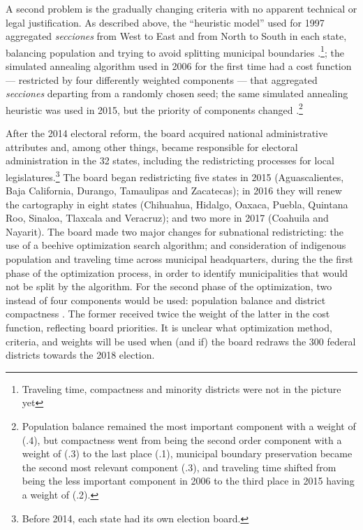 \documentclass[letter,12pt]{article}
\begin{document}
A second problem is the gradually changing criteria with no apparent technical or legal justification. As described above, the ``heuristic model'' used for 1997 aggregated \emph{secciones} from West to East and from North to South in each state, balancing population and trying to avoid splitting municipal boundaries \citep{trelles.mtz.tesisItam.2007}.\footnote{Traveling time, compactness and minority districts were not in the picture yet}; the simulated annealing algorithm used in 2006 for the first time had a cost function --- restricted by four differently weighted components --- that aggregated \emph{secciones} departing from a randomly chosen seed; the same simulated annealing heuristic was used in 2015, but the priority of components changed \citep{acuerdo.ife.2004,acuerdo.ife.2013}.\footnote{Population balance remained the most important component with a weight of (.4), but compactness went from being the second order component with a weight of (.3) to the last place (.1), municipal boundary preservation became the second most relevant component (.3), and traveling time shifted from being the less important component in 2006 to the third place in 2015 having a weight of (.2).} 

After the 2014 electoral reform, the board acquired national administrative attributes and, among other things, became responsible for electoral administration in the 32 states, including the redistricting processes for local legislatures.\footnote{Before 2014, each state had its own election board.} The board began redistricting five states in 2015 (Aguascalientes, Baja California, Durango, Tamaulipas and Zacatecas); in 2016 they will renew the cartography in eight states (Chihuahua, Hidalgo, Oaxaca, Puebla, Quintana Roo, Sinaloa, Tlaxcala and Veracruz); and two more in 2017 (Coahuila and Nayarit). The board made two major changes for subnational redistricting: the use of a beehive optimization search algorithm; and consideration of indigenous population and traveling time across municipal headquarters, during the the first phase of the optimization process, in order to identify municipalities that would not be split by the algorithm. For the second phase of the optimization, two instead of four components would be used: population balance and district compactness \citep{ine.modelo.2015}. The former received twice the weight of the latter in the cost function, reflecting board priorities. It is unclear what optimization method, criteria, and weights will be used when (and if) the board redraws the 300 federal districts towards the 2018 election. 
\end{document}
